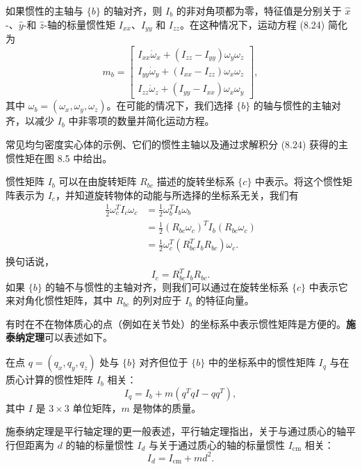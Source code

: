 \documentclass[12pt,a4paper]{article}
\begin{document}
如果惯性的主轴与 $\{b\}$ 的轴对齐，则 $I_b$ 的非对角项都为零，特征值是分别关于 $\hat{x}$-、$\hat{y}$-和 $\hat{z}$-轴的标量惯性矩 $I_{xx}$、$I_{yy}$ 和 $I_{zz}$。在这种情况下，运动方程 (8.24) 简化为
\begin{equation}
m_b = \begin{bmatrix}
I_{xx}\dot{\omega}_x + (I_{zz} - I_{yy})\omega_y \omega_z \\
I_{yy}\dot{\omega}_y + (I_{xx} - I_{zz})\omega_x \omega_z \\
I_{zz}\dot{\omega}_z + (I_{yy} - I_{xx})\omega_x \omega_y
\end{bmatrix}, \label{eq:8.25}
\end{equation}
其中 $\omega_b = (\omega_x, \omega_y, \omega_z)$。在可能的情况下，我们选择 $\{b\}$ 的轴与惯性的主轴对齐，以减少 $I_b$ 中非零项的数量并简化运动方程。

常见均匀密度实心体的示例、它们的惯性主轴以及通过求解积分 (8.24) 获得的主惯性矩在图 8.5 中给出。

惯性矩阵 $I_b$ 可以在由旋转矩阵 $R_{bc}$ 描述的旋转坐标系 $\{c\}$ 中表示。将这个惯性矩阵表示为 $I_c$，并知道旋转物体的动能与所选择的坐标系无关，我们有
\begin{align}
\frac{1}{2}\omega_c^T I_c \omega_c &= \frac{1}{2}\omega_b^T I_b \omega_b \nonumber \\
&= \frac{1}{2}(R_{bc}\omega_c)^T I_b(R_{bc}\omega_c) \nonumber \\
&= \frac{1}{2}\omega_c^T(R_{bc}^T I_b R_{bc})\omega_c.
\end{align}
换句话说，
\begin{equation}
I_c = R_{bc}^T I_b R_{bc}. \label{eq:8.26}
\end{equation}
如果 $\{b\}$ 的轴不与惯性的主轴对齐，则我们可以通过在旋转坐标系 $\{c\}$ 中表示它来对角化惯性矩阵，其中 $R_{bc}$ 的列对应于 $I_b$ 的特征向量。

有时在不在物体质心的点（例如在关节处）的坐标系中表示惯性矩阵是方便的。\textbf{施泰纳定理}可以表述如下。

\begin{theorem}[定理 8.2]
在点 $q = (q_x, q_y, q_z)$ 处与 $\{b\}$ 对齐但位于 $\{b\}$ 中的坐标系中的惯性矩阵 $I_q$ 与在质心计算的惯性矩阵 $I_b$ 相关：
\begin{equation}
I_q = I_b + m(q^T qI - qq^T), \label{eq:8.27}
\end{equation}
其中 $I$ 是 $3 \times 3$ 单位矩阵，$m$ 是物体的质量。
\end{theorem}

施泰纳定理是平行轴定理的更一般表述，平行轴定理指出，关于与通过质心的轴平行但距离为 $d$ 的轴的标量惯性 $I_d$ 与关于通过质心的轴的标量惯性 $I_{\text{cm}}$ 相关：
\begin{equation}
I_d = I_{\text{cm}} + md^2. \label{eq:8.28}
\end{equation}
\end{document}
